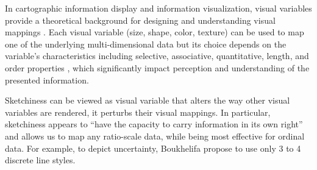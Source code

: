 In cartographic information display \cite{Bertin1983} 
and information visualization,
visual variables  provide a theoretical background for designing and understanding visual mappings \cite{Skupin2000}.
Each visual variable (\eg size, shape, color, texture) can be used to map one of the underlying multi-dimensional data 
but its choice depends on the variable's characteristics including
selective, associative, quantitative, length, and order properties \cite{Carpendale2003}, which significantly impact perception and understanding of the presented information. 

Sketchiness can be viewed as visual variable 
that alters the way other visual variables are rendered, 
\ie it perturbs their visual mappings.
In particular, sketchiness appears to \enquote{have the capacity to carry information in its own right} \cite{Wood2012} 
and allows us to map any ratio-scale data, while being most effective for ordinal data. 
For example, to depict uncertainty, Boukhelifa \etal \cite{Boukhelifa2012} propose to use only 3 to 4 discrete line styles.

